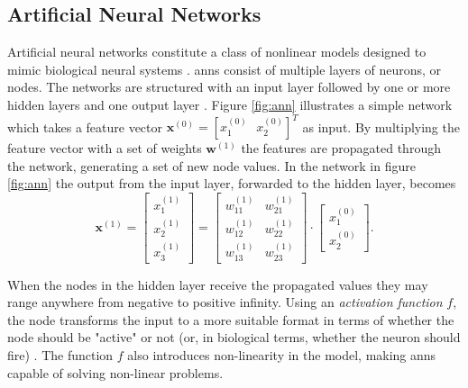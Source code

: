 

\subsection{Artificial Neural Networks}
Artificial neural networks constitute a class of nonlinear models designed to mimic biological neural systems \citep{rojas_1996}. \gls{ann}s consist of multiple layers of neurons, or nodes. The networks are structured with an input layer followed by one or more hidden layers and one output layer \citep{logan_2017}. Figure \ref{fig:ann} illustrates a simple network which takes a feature vector $\mathbf{x}^{(0)}=[x_1^{(0)}\text{ }  x_2^{(0)}]^{T}$ as input. By multiplying the feature vector with a set of weights $\mathbf{w}^{(1)}$ the features are propagated through the network, generating a set of new node values. In the network in figure \ref{fig:ann} the output from the input layer, forwarded to the hidden layer, becomes
\begin{equation}\label{eq:nn}
	\mathbf{x}^{(1)}=\begin{bmatrix}x_1^{(1)} \\ x_2^{(1)} \\ x_3^{(1)} \end{bmatrix} = 
	\begin{bmatrix} w_{11}^{(1)} & w_{21}^{(1)} \\ w_{12}^{(1)} & w_{22}^{(1)} \\ w_{13}^{(1)} & w_{23}^{(1)}\end{bmatrix}\cdot \begin{bmatrix}x_1^{(0)} \\ x_2^{(0)}\end{bmatrix}.
\end{equation}

When the nodes in the hidden layer receive the propagated values they may range anywhere from negative to positive infinity. Using an \textit{activation function} $f$, the node transforms the input to a more suitable format in terms of whether the node should be "active" or not (or, in biological terms, whether the neuron should fire) \citep{kriesel_2007}. The function $f$ also introduces non-linearity in the model, making \gls{ann}s capable of solving non-linear problems. 

